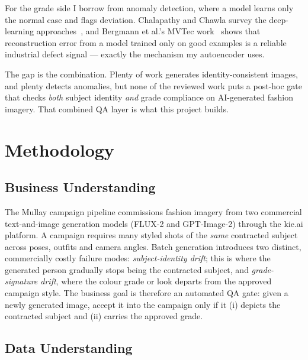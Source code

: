 \documentclass[conference]{IEEEtran}
\begin{document}
For the grade side I borrow from anomaly detection, where a model learns only
the normal case and flags deviation. Chalapathy and Chawla survey the
deep-learning approaches~\cite{chalapathy2019deep}, and Bergmann et al.'s MVTec
work~\cite{bergmann2019mvtec} shows that reconstruction error from a model
trained only on good examples is a reliable industrial defect signal --- exactly
the mechanism my autoencoder uses.

The gap is the combination. Plenty of work generates identity-consistent images,
and plenty detects anomalies, but none of the reviewed work puts a post-hoc gate
that checks \emph{both} subject identity \emph{and} grade compliance on
AI-generated fashion imagery. That combined QA layer is what this project builds.

\section{Methodology}
\label{sec:method}

\subsection{Business Understanding}
The Mullay campaign pipeline commissions fashion imagery from two commercial
text-and-image generation models (FLUX-2 and GPT-Image-2) through the kie.ai
platform. A campaign requires many styled shots of the \emph{same} contracted
subject across poses, outfits and camera angles. Batch generation introduces
two distinct, commercially costly failure modes: \emph{subject-identity drift}; this is
where the generated person gradually stops being the contracted subject, and
\emph{grade-signature drift}, where the colour grade or look departs from the
approved campaign style. The business goal is therefore an automated QA gate: given a newly
generated image, accept it into the campaign only if it (i) depicts the
contracted subject and (ii) carries the approved grade.

\subsection{Data Understanding}
\end{document}
